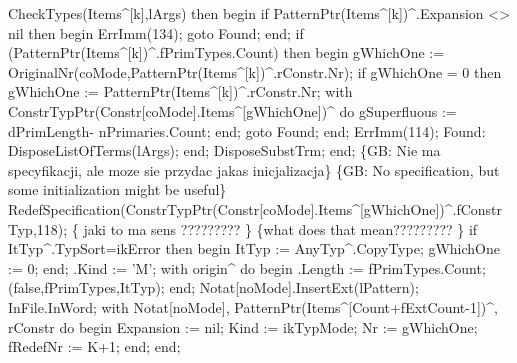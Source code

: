                   CheckTypes(Items^[k],lArgs) then
            begin
               if PatternPtr(Items^[k])^.Expansion <> nil then
               begin
                  ErrImm(134);
                  goto Found;
               end;
               if (PatternPtr(Items^[k])^.fPrimTypes.Count) then
               begin
                  gWhichOne := OriginalNr(coMode,PatternPtr(Items^[k])^.rConstr.Nr);
                  if gWhichOne = 0 then
                     gWhichOne := PatternPtr(Items^[k])^.rConstr.Nr;
                  with ConstrTypPtr(Constr[coMode].Items^[gWhichOne])^ do
                     gSuperfluous := dPrimLength- nPrimaries.Count;
               end;
               goto Found;
            end;
         ErrImm(114);
         Found:
            DisposeListOfTerms(lArgs);
      end;
      DisposeSubstTrm;
   end;
   \{GB: Nie ma specyfikacji, ale moze sie przydac jakas inicjalizacja\}
   \{GB: No specification, but some initialization might be useful\}
   RedefSpecification(ConstrTypPtr(Constr[coMode].Items^[gWhichOne])^.fConstrTyp,118);
   \{ jaki to ma sens ????????? \} \{what does that mean????????? \}
   if ItTyp^.TypSort=ikError then
   begin
      ItTyp := AnyTyp^.CopyType;
      gWhichOne := 0;
   end;
   .Kind := 'M';
   with origin^ do
   begin
      .Length := fPrimTypes.Count;
      (false,fPrimTypes,ItTyp);
   end;
   Notat[noMode].InsertExt(lPattern);
   InFile.InWord;
   with Notat[noMode], PatternPtr(Items^[Count+fExtCount-1])^, rConstr do
   begin
      Expansion := nil;
      Kind := ikTypMode;
      Nr := gWhichOne;
      fRedefNr :=  K+1;
   end;
end;
\eatline
{}\nwendcode{}\nwdocspar

